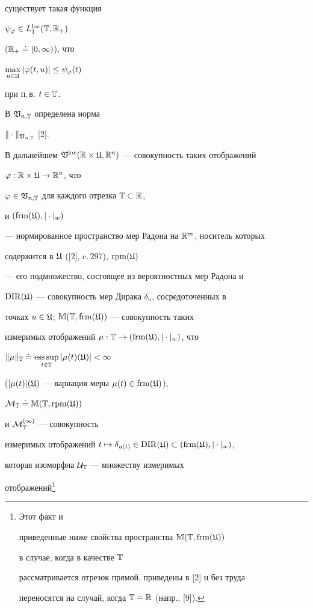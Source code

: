 существует такая функция


$\psi_{\varphi}\in L_1^{\operatorname{loc}}(\Bbb T,\Bbb R_+)$


($\Bbb R_+\doteq[0,\infty)$), что


$\max\limits_{u\in\frak U}|\varphi(t,u)|\le\psi_{\varphi}(t)$


при п.\,в. $t\in\Bbb T$.


В $\frak V_{n,\Bbb T}$ определена норма


$\|\cdot\|_{\frak V_{n,\Bbb T}}$ [2].


В дальнейшем $\frak V^{\loc}(\Bbb R


\times\frak U,\Bbb R^n)$ --- совокупность таких отображений


$\varphi:\Bbb R\times\frak U\to\Bbb R^n$, что


$\varphi\in\frak V_{n,\Bbb T}$ для каждого отрезка $\Bbb T\subset\Bbb R$,


и $(\operatorname{frm}(\frak U),|\cdot|_{w})$


--- нормированное пространство мер Радона на $\Bbb R^m$, носитель которых


содержится в $\frak U$ ([2], c.\,297), $\operatorname{rpm}(\frak U)$


--- его подмножество, состоящее из вероятностных мер Радона и


$\operatorname{DIR}(\frak U)$ --- совокупность мер Дирака $\delta_u$, сосредоточенных в


точках $u\in\frak U$; $\Bbb M(\Bbb T,\operatorname{frm}(\frak U))$ --- совокупность таких


измеримых отображений $\mu:\Bbb T\to(\operatorname{frm}(\frak U),|\cdot|_{w})$, что


$\|\mu\|_{\Bbb T}\doteq\esssup\limits_{t\in\Bbb T}


|\mu(t)(\frak U)|<\infty$


($|\mu(t)|(\frak U)$ --- вариация меры $\mu(t)\in\operatorname{frm}(\frak U)$),


$\cal M_{\Bbb T}\doteq \Bbb M(\Bbb T,\operatorname{rpm}(\frak U))$


и $\cal M_{\Bbb T}^{(1)}$ --- совокупность


измеримых отображений $t\mapsto\delta_{u(t)}\in\DIR(\frak U)


\subset(\frm(\frak U),|\cdot|_{w})$,


которая изоморфна $\cal U_{\Bbb T}$ --- множеству измеримых


отображений\footnote{Этот факт и


приведенные ниже свойства пространства $\Bbb M(\Bbb T,\operatorname{frm}(\frak U))$


в случае, когда в качестве $\Bbb T$


рассматривается отрезок прямой, приведены в [2] и без труда


переносятся на случай, когда $\Bbb T=\Bbb R$ (напр., [9]).}


